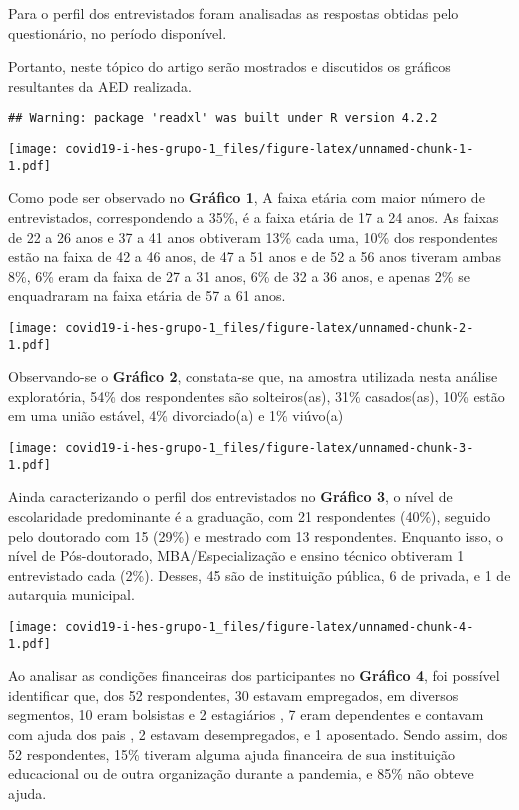 \documentclass[
]{article}
\begin{document}
Para o perfil dos entrevistados foram analisadas as respostas obtidas
pelo questionário, no período disponível.

Portanto, neste tópico do artigo serão mostrados e discutidos os
gráficos resultantes da AED realizada.

\begin{verbatim}
## Warning: package 'readxl' was built under R version 4.2.2
\end{verbatim}

\texttt{[image: covid19-i-hes-grupo-1\_files/figure-latex/unnamed-chunk-1-1.pdf]}

Como pode ser observado no \textbf{Gráfico 1}, A faixa etária com maior
número de entrevistados, correspondendo a 35\%, é a faixa etária de 17 a
24 anos. As faixas de 22 a 26 anos e 37 a 41 anos obtiveram 13\% cada
uma, 10\% dos respondentes estão na faixa de 42 a 46 anos, de 47 a 51
anos e de 52 a 56 anos tiveram ambas 8\%, 6\% eram da faixa de 27 a 31
anos, 6\% de 32 a 36 anos, e apenas 2\% se enquadraram na faixa etária
de 57 a 61 anos.

\texttt{[image: covid19-i-hes-grupo-1\_files/figure-latex/unnamed-chunk-2-1.pdf]}

Observando-se o \textbf{Gráfico 2}, constata-se que, na amostra
utilizada nesta análise exploratória, 54\% dos respondentes são
solteiros(as), 31\% casados(as), 10\% estão em uma união estável, 4\%
divorciado(a) e 1\% viúvo(a)

\texttt{[image: covid19-i-hes-grupo-1\_files/figure-latex/unnamed-chunk-3-1.pdf]}

Ainda caracterizando o perfil dos entrevistados no \textbf{Gráfico 3}, o
nível de escolaridade predominante é a graduação, com 21 respondentes
(40\%), seguido pelo doutorado com 15 (29\%) e mestrado com 13
respondentes. Enquanto isso, o nível de Pós-doutorado,
MBA/Especialização e ensino técnico obtiveram 1 entrevistado cada (2\%).
Desses, 45 são de instituição pública, 6 de privada, e 1 de autarquia
municipal.

\texttt{[image: covid19-i-hes-grupo-1\_files/figure-latex/unnamed-chunk-4-1.pdf]}

Ao analisar as condições financeiras dos participantes no
\textbf{Gráfico 4}, foi possível identificar que, dos 52 respondentes,
30 estavam empregados, em diversos segmentos, 10 eram bolsistas e 2
estagiários , 7 eram dependentes e contavam com ajuda dos pais , 2
estavam desempregados, e 1 aposentado. Sendo assim, dos 52 respondentes,
15\% tiveram alguma ajuda financeira de sua instituição educacional ou
de outra organização durante a pandemia, e 85\% não obteve ajuda.
\end{document}
